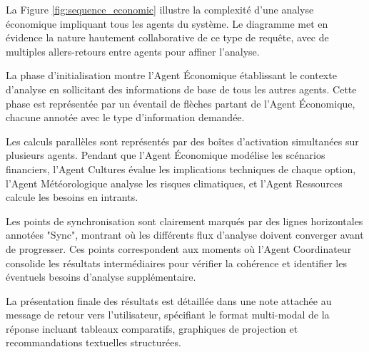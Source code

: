 La Figure \ref{fig:sequence_economic} illustre la complexité d'une analyse économique impliquant tous les agents du système. Le diagramme met en évidence la nature hautement collaborative de ce type de requête, avec de multiples allers-retours entre agents pour affiner l'analyse.

La phase d'initialisation montre l'Agent Économique établissant le contexte d'analyse en sollicitant des informations de base de tous les autres agents. Cette phase est représentée par un éventail de flèches partant de l'Agent Économique, chacune annotée avec le type d'information demandée.

Les calculs parallèles sont représentés par des boîtes d'activation simultanées sur plusieurs agents. Pendant que l'Agent Économique modélise les scénarios financiers, l'Agent Cultures évalue les implications techniques de chaque option, l'Agent Météorologique analyse les risques climatiques, et l'Agent Ressources calcule les besoins en intrants.

Les points de synchronisation sont clairement marqués par des lignes horizontales annotées "Sync", montrant où les différents flux d'analyse doivent converger avant de progresser. Ces points correspondent aux moments où l'Agent Coordinateur consolide les résultats intermédiaires pour vérifier la cohérence et identifier les éventuels besoins d'analyse supplémentaire.

La présentation finale des résultats est détaillée dans une note attachée au message de retour vers l'utilisateur, spécifiant le format multi-modal de la réponse incluant tableaux comparatifs, graphiques de projection et recommandations textuelles structurées.
